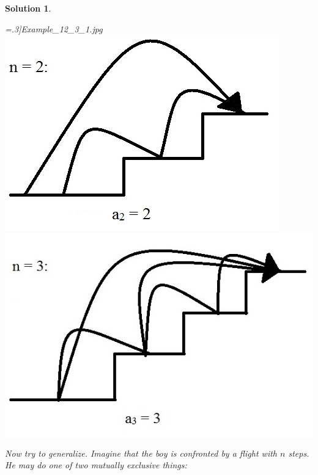 \documentclass[12pt, letterpaper, onecolumn, conference, final]{IEEEtran}
\theoremstyle{definition}
\theoremstyle{plain}
\newtheorem{solution}{Solution}[section]
\begin{document}
\begin{solution}
\begin{center}
=.3]{Example_12_3_1.jpg} \includegraphics[scale=.3]{Example_12_3_2.jpg} \includegraphics[scale=.3]{Example_12_3_3.jpg}
\end{center}
Now try to generalize. Imagine that the boy is confronted by a flight with $n$ steps. He may do one of two mutually exclusive things:
\begin{itemize}


\end{itemize}
\end{solution}
\end{document}
